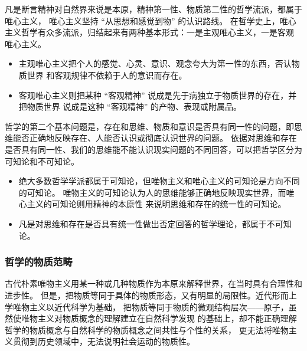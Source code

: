 \documentclass[10pt, UTF8]{book} %
\begin{document}
{\begin{mdframed}[frametitle={哲学的基本问题及其派别分类}]
    
    凡是断言精神对自然界来说是本原，精神第一性、物质第二性的哲学流派，都属于唯心主义，
    唯心主义坚持 “从思想和感觉到物” 的认识路线。
    在哲学史上，唯心主义哲学有众多流派，归结起来有两种基本形式：一是主观唯心主义，一是客观
    唯心主义。
    \begin{itemize}[itemsep=0pt]
        \item 主观唯心主义把个人的感觉、心灵、意识、观念夸大为第一性的东西，否认物质世界
        和客观规律不依赖于人的意识而存在。
        \item 客观唯心主义则把某种 “客观精神” 说成是先于病独立于物质世界的存在，并把物质世界
        说成是这种 “客观精神” 的产物、表现或附属品。
    \end{itemize}
    
    哲学的第二个基本问题是，存在和思维、物质和意识是否具有同一性的问题，即思维能否正确地反映存在、人能否认识或彻底认识世界的问题。
    依据对思维和存在是否具有同一性、我们的思维能不能认识现实问题的不同回答，可以把哲学区分为
    可知论和不可知论。
    \begin{itemize}[itemsep=0pt]
        \item 绝大多数哲学学派都属于可知论，但唯物主义和唯心主义的可知论是方向不同的可知论。
        唯物主义的可知论认为人的思维能够正确地反映现实世界，而唯心主义的可知论则用精神的本原性
        来说明思维和存在的统一性的可知论。
        \item 凡是对思维和存在是否具有统一性做出否定回答的哲学理论，都属于不可知论。
    \end{itemize}
\end{mdframed}}

\subsubsection{哲学的物质范畴}

古代朴素唯物主义用某一种或几种物质作为本原来解释世界，在当时具有合理性和进步性。
但是，把物质等同于具体的物质形态，又有明显的局限性。近代形而上学唯物主义以近代科学为基础，
把物质等同于物质的微观结构层次——原子，虽然使唯物主义对物质概念的理解建立在自然科学发现
的基础上，却不能正确理解哲学的物质概念与自然科学的物质概念之间共性与个性的关系，
更无法将唯物主义贯彻到历史领域中，无法说明社会运动的物质性。
\end{document}
